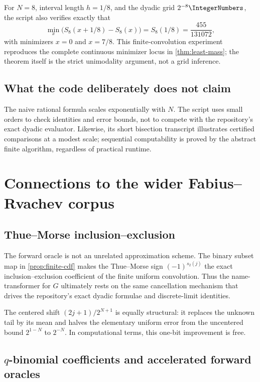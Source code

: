 \documentclass[11pt,oneside]{article}
\theoremstyle{definition}
\theoremstyle{remark}
\numberwithin{equation}{section}
\begin{document}
For $N=8$, interval length $h=1/8$, and the dyadic grid $2^{-8}\IntegerNumbers$, the script
also verifies exactly that
\[
 \min_x\bigl(S_8(x+1/8)-S_8(x)\bigr)
 =S_8(1/8)=\frac{455}{131072},
\]
with minimizers $x=0$ and $x=7/8$.  This finite-convolution experiment
reproduces the complete continuous minimizer locus in \cref{thm:least-mass};
the theorem itself is the strict unimodality argument, not a grid inference.

\subsection{What the code deliberately does not claim}

The naive rational formula scales exponentially with $N$.  The script uses
small orders to check identities and error bounds, not to compete with the
repository's exact dyadic evaluator.  Likewise, its short bisection transcript
illustrates certified comparisons at a modest scale; sequential computability
is proved by the abstract finite algorithm, regardless of practical runtime.

\section{Connections to the wider Fabius--Rvachev corpus}
\label{sec:connections}

\subsection{Thue--Morse inclusion--exclusion}

The forward oracle is not an unrelated approximation scheme.  The binary
subset map in \cref{prop:finite-cdf} makes the Thue--Morse sign
$(-1)^{s_2(j)}$ the exact inclusion--exclusion coefficient of the finite
uniform convolution.  Thus the name-transformer for $G$ ultimately rests on
the same cancellation mechanism that drives the repository's exact dyadic
formulae and discrete-limit identities.

The centered shift $(2j+1)/2^{N+1}$ is equally structural: it replaces the
unknown tail by its mean and halves the elementary uniform error from the
uncentered bound $2^{1-N}$ to $2^{-N}$.  In computational terms, this one-bit
improvement is free.

\subsection{\texorpdfstring{$q$}{q}-binomial coefficients and accelerated forward oracles}
\end{document}
